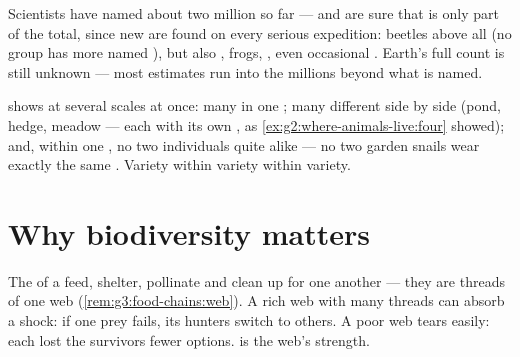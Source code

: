 \begin{example}\label{ex:g5:biodiversity:planet}
Scientists have named about two million  so far ---
and are sure that is only part of the total, since new
 are found on every serious expedition: beetles above
all (no group has more named ), but also , frogs,
, even occasional . Earth's full  count
is still unknown --- most estimates run into the millions
beyond what is named.
\end{example}

\begin{remark}\label{rem:g5:biodiversity:scales}
 shows at several scales at once: many  in
one ; many different  side by side (pond,
hedge, meadow --- each with its own , as
\cref{ex:g2:where-animals-live:four} showed); and, within one
, no two individuals quite alike --- no two garden
snails wear exactly the same . Variety within variety
within variety.
\end{remark}

\section{Why biodiversity matters}

\begin{proposition}\label{prop:g5:biodiversity:web}
The  of a  feed, shelter, pollinate and clean
up for one another --- they are threads of one web
(\cref{rem:g3:food-chains:web}). A rich web with many threads
can absorb a shock: if one prey  fails, its hunters
switch to others. A poor web tears easily: each lost 
 the survivors fewer options.  is the
web's strength.
\end{proposition}
\admitted

